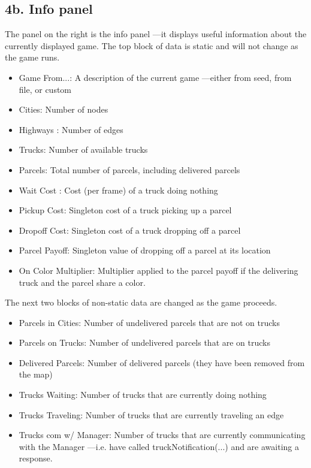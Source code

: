 \documentclass[11pt]{article}
\begin{document}
\subsection{4b. Info panel}
The panel on the right is the info panel ---it displays useful information about the currently displayed game.
The top block of data is static and will not change as the game runs.
\begin{itemize}
\item Game From...: A description of the current game ---either from seed, from file, or custom
\item Cities: Number of nodes
\item Highways : Number of edges
\item Trucks:  Number of available trucks
\item Parcels:  Total number of parcels, including delivered parcels
\item Wait Cost : Cost (per frame) of a truck doing nothing
\item Pickup Cost: Singleton cost of a truck picking up a parcel
\item Dropoff Cost: Singleton cost of a truck dropping off a parcel
\item Parcel Payoff: Singleton value of dropping off a parcel at its location
\item On Color Multiplier: Multiplier applied to the parcel payoff if the delivering truck and the parcel share a color.
\end{itemize}

The next two blocks of non-static data are changed as the game proceeds.

\begin{itemize}
\item Parcels in Cities: Number of undelivered parcels that are not on trucks
\item Parcels on Trucks: Number of undelivered parcels that are on trucks
\item Delivered Parcels: Number of delivered parcels (they have been removed from the map)
\item Trucks Waiting: Number of trucks that are currently doing nothing
\item Trucks Traveling: Number of trucks that are currently traveling an edge
\item Trucks com w/ Manager: Number of trucks that are currently communicating with the Manager —i.e. have called truckNotification(...) and are awaiting a response.
\end{itemize}
\end{document}
